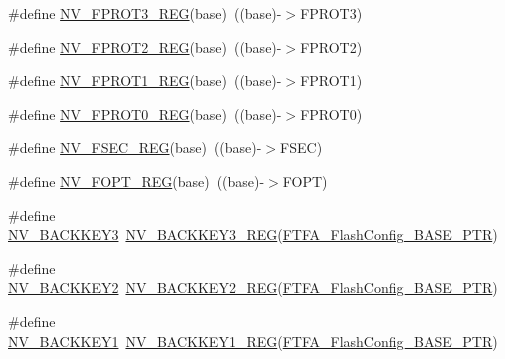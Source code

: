 \begin{DoxyCompactItemize}
\#define \hyperlink{group___n_v___register___accessor___macros_ga7ef7bb75074b8db9da605af5ca216f74}{N\+V\+\_\+\+F\+P\+R\+O\+T3\+\_\+\+R\+EG}(base)~((base)-\/$>$F\+P\+R\+O\+T3)
\item 
\#define \hyperlink{group___n_v___register___accessor___macros_gabac2653345915e29796a13ba870336c3}{N\+V\+\_\+\+F\+P\+R\+O\+T2\+\_\+\+R\+EG}(base)~((base)-\/$>$F\+P\+R\+O\+T2)
\item 
\#define \hyperlink{group___n_v___register___accessor___macros_ga2cb779bd7985368b49343a7a4227a4c2}{N\+V\+\_\+\+F\+P\+R\+O\+T1\+\_\+\+R\+EG}(base)~((base)-\/$>$F\+P\+R\+O\+T1)
\item 
\#define \hyperlink{group___n_v___register___accessor___macros_ga7142989d8224cb5f1b5e466c72363e3a}{N\+V\+\_\+\+F\+P\+R\+O\+T0\+\_\+\+R\+EG}(base)~((base)-\/$>$F\+P\+R\+O\+T0)
\item 
\#define \hyperlink{group___n_v___register___accessor___macros_ga67787d311ca4c58b135b4427b0431dca}{N\+V\+\_\+\+F\+S\+E\+C\+\_\+\+R\+EG}(base)~((base)-\/$>$F\+S\+EC)
\item 
\#define \hyperlink{group___n_v___register___accessor___macros_ga0fd99fc3ae6d1b27bb5e0448f6c90761}{N\+V\+\_\+\+F\+O\+P\+T\+\_\+\+R\+EG}(base)~((base)-\/$>$F\+O\+PT)
\item 
\#define \hyperlink{group___n_v___register___accessor___macros_ga18932af5b184d02998db112b364e45e1}{N\+V\+\_\+\+B\+A\+C\+K\+K\+E\+Y3}~\hyperlink{group___n_v___register___accessor___macros_gafc7fe743ed5040278c07df44c3679f34}{N\+V\+\_\+\+B\+A\+C\+K\+K\+E\+Y3\+\_\+\+R\+EG}(\hyperlink{group___n_v___peripheral_ga3458652dfc38239f92682556e63596b5}{F\+T\+F\+A\+\_\+\+Flash\+Config\+\_\+\+B\+A\+S\+E\+\_\+\+P\+TR})
\item 
\#define \hyperlink{group___n_v___register___accessor___macros_ga51642a3d84acba43ff0aa3925226ab32}{N\+V\+\_\+\+B\+A\+C\+K\+K\+E\+Y2}~\hyperlink{group___n_v___register___accessor___macros_gac4ba0b0f5728c1f8cccf007efe73b218}{N\+V\+\_\+\+B\+A\+C\+K\+K\+E\+Y2\+\_\+\+R\+EG}(\hyperlink{group___n_v___peripheral_ga3458652dfc38239f92682556e63596b5}{F\+T\+F\+A\+\_\+\+Flash\+Config\+\_\+\+B\+A\+S\+E\+\_\+\+P\+TR})
\item 
\#define \hyperlink{group___n_v___register___accessor___macros_gae849f8e6eaa76305b07c567463074dc9}{N\+V\+\_\+\+B\+A\+C\+K\+K\+E\+Y1}~\hyperlink{group___n_v___register___accessor___macros_ga7d1008712187c004855ee43a54b4e2a6}{N\+V\+\_\+\+B\+A\+C\+K\+K\+E\+Y1\+\_\+\+R\+EG}(\hyperlink{group___n_v___peripheral_ga3458652dfc38239f92682556e63596b5}{F\+T\+F\+A\+\_\+\+Flash\+Config\+\_\+\+B\+A\+S\+E\+\_\+\+P\+TR})

\end{DoxyCompactItemize}
